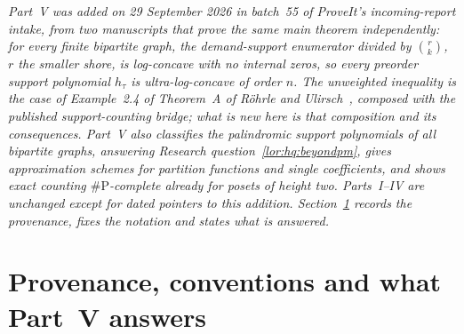 \documentclass[11pt]{article}
\numberwithin{equation}{section}
\theoremstyle{definition}
\begin{document}
\noindent\emph{Part~V was added on 29 September 2026 in batch~55 of
ProveIt's incoming-report intake, from two manuscripts that prove the same
main theorem independently: for every finite bipartite graph, the
demand-support enumerator divided by $\binom rk$, $r$ the smaller shore, is
log-concave with no internal zeros, so every preorder support polynomial
$h_\tau$ is ultra-log-concave of order $n$. The unweighted inequality is the
case of Example~2.4 of Theorem~A of R\"ohrle and Ulirsch~\cite{RU}, composed
with the published support-counting bridge; what is new here is that
composition and its consequences. Part~V also classifies the palindromic
support polynomials of all bipartite graphs, answering Research
question~\ref{lor:hq:beyondpm}, gives approximation schemes for partition
functions and single coefficients, and shows exact counting
$\#\mathrm P$-complete already for posets of height two. Parts~I--IV are
unchanged except for dated pointers to this addition.
Section~\ref{lor:sec:prov} records the provenance, fixes the notation and
states what is answered.}

\section{Provenance, conventions and what Part~V answers}
\label{lor:sec:prov}
\end{document}
